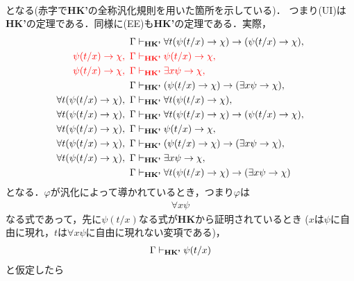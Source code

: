 \begin{metaprf}
\begin{description}
\begin{align}
			\end{align}
			となる(赤字で{\bf HK'}の全称汎化規則を用いた箇所を示している)．
			つまり(UI)は{\bf HK'}の定理である．同様に(EE)も{\bf HK'}の定理である．実際，
			\begin{align}
				\Gamma &\vdash_{{\scriptsize \mbox{{\bf HK'}}}} 
					\forall t (\psi(t/x) \rightarrow \chi) 
					\rightarrow (\psi(t/x) \rightarrow \chi), \\
				\color{red}\psi(t/x) \rightarrow \chi,\ \Gamma &
				\color{red}\vdash_{{\scriptsize \mbox{{\bf HK'}}}}
					\psi(t/x) \rightarrow \chi, \\
				\color{red}\psi(t/x) \rightarrow \chi,\ \Gamma &
				\color{red}\vdash_{{\scriptsize \mbox{{\bf HK'}}}}
					\exists x \psi \rightarrow \chi, \\
				\Gamma &\vdash_{{\scriptsize \mbox{{\bf HK'}}}} (\psi(t/x) \rightarrow \chi) 
					\rightarrow (\exists x \psi \rightarrow \chi), \\
				\forall t (\psi(t/x) \rightarrow \chi),\ \Gamma
					&\vdash_{{\scriptsize \mbox{{\bf HK'}}}} \forall t (\psi(t/x) \rightarrow \chi), \\
				\forall t (\psi(t/x) \rightarrow \chi),\ \Gamma
					&\vdash_{{\scriptsize \mbox{{\bf HK'}}}} \forall t (\psi(t/x) \rightarrow \chi)
					\rightarrow (\psi(t/x) \rightarrow \chi), \\
				\forall t (\psi(t/x) \rightarrow \chi),\ \Gamma
					&\vdash_{{\scriptsize \mbox{{\bf HK'}}}} \psi(t/x) \rightarrow \chi, \\
				\forall t (\psi(t/x) \rightarrow \chi),\ \Gamma
					&\vdash_{{\scriptsize \mbox{{\bf HK'}}}} (\psi(t/x) \rightarrow \chi) 
					\rightarrow (\exists x \psi \rightarrow \chi), \\
				\forall t (\psi(t/x) \rightarrow \chi),\ \Gamma
					&\vdash_{{\scriptsize \mbox{{\bf HK'}}}} \exists x \psi \rightarrow \chi, \\
				\Gamma &\vdash_{{\scriptsize \mbox{{\bf HK'}}}} \forall t (\psi(t/x) \rightarrow \chi) 
					\rightarrow (\exists x \psi \rightarrow \chi)
			\end{align}
			となる．$\varphi$が汎化によって導かれているとき，つまり$\varphi$は
			\begin{align}
				\forall x \psi
			\end{align}
			なる式であって，先に$\psi(t/x)$なる式が{\bf HK}から証明されているとき
			($x$は$\psi$に自由に現れ，$t$は$\forall x \psi$に自由に現れない変項である)，
			\begin{align}
				\Gamma \vdash_{{\scriptsize \mbox{{\bf HK'}}}} \psi(t/x)
			\end{align}
			と仮定したら
			\begin{align}

\end{align}
\end{description}
\end{metaprf}
